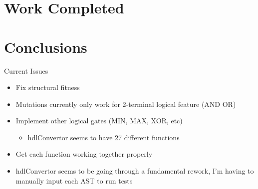 \documentclass[handout]{beamer}
\begin{document}
\section{Work Completed}

\section{Conclusions}
\begin{frame}{Current Issues}
  \begin{itemize}
    \item Fix structural fitness
    \item Mutations currently only work for 2-terminal logical feature (AND OR)
    \item Implement other logical gates (MIN, MAX, XOR, etc)
    \begin{itemize}
      \item hdlConvertor seems to have 27 different functions
    \end{itemize}
    \item Get each function working together properly
    \item hdlConvertor seems to be going through a fundamental rework, I'm having to manually input each AST to run tests
  \end{itemize}
\end{frame}
\end{document}
